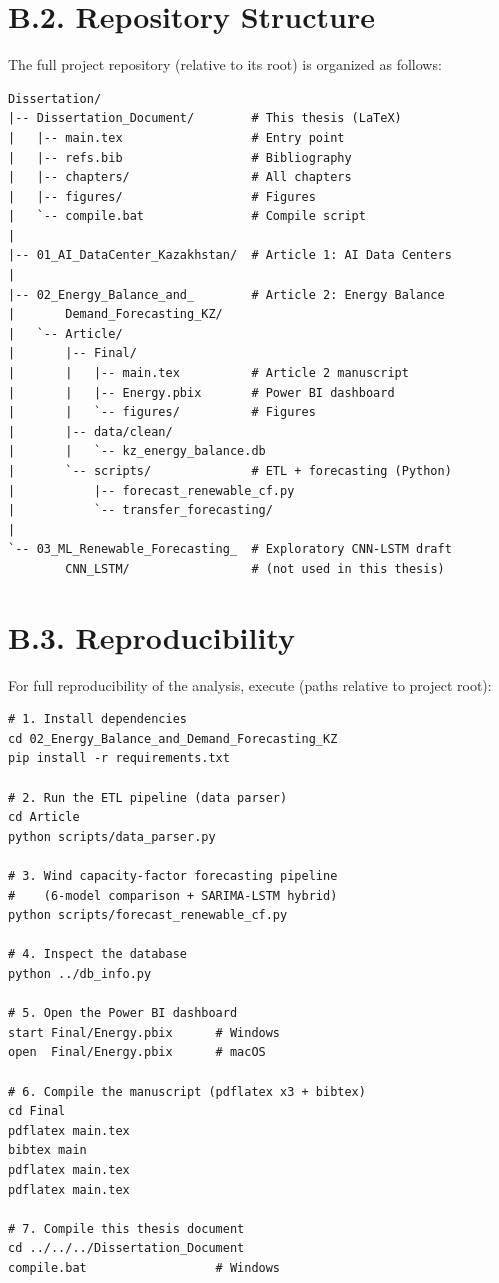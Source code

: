 \section*{B.2. Repository Structure}

The full project repository (relative to its root) is organized as follows:

{\footnotesize
\begin{verbatim}
Dissertation/
|-- Dissertation_Document/        # This thesis (LaTeX)
|   |-- main.tex                  # Entry point
|   |-- refs.bib                  # Bibliography
|   |-- chapters/                 # All chapters
|   |-- figures/                  # Figures
|   `-- compile.bat               # Compile script
|
|-- 01_AI_DataCenter_Kazakhstan/  # Article 1: AI Data Centers
|
|-- 02_Energy_Balance_and_        # Article 2: Energy Balance
|       Demand_Forecasting_KZ/
|   `-- Article/
|       |-- Final/
|       |   |-- main.tex          # Article 2 manuscript
|       |   |-- Energy.pbix       # Power BI dashboard
|       |   `-- figures/          # Figures
|       |-- data/clean/
|       |   `-- kz_energy_balance.db
|       `-- scripts/              # ETL + forecasting (Python)
|           |-- forecast_renewable_cf.py
|           `-- transfer_forecasting/
|
`-- 03_ML_Renewable_Forecasting_  # Exploratory CNN-LSTM draft
        CNN_LSTM/                 # (not used in this thesis)
\end{verbatim}
}

\section*{B.3. Reproducibility}

For full reproducibility of the analysis, execute (paths relative to project root):

{\footnotesize
\begin{verbatim}
# 1. Install dependencies
cd 02_Energy_Balance_and_Demand_Forecasting_KZ
pip install -r requirements.txt

# 2. Run the ETL pipeline (data parser)
cd Article
python scripts/data_parser.py

# 3. Wind capacity-factor forecasting pipeline
#    (6-model comparison + SARIMA-LSTM hybrid)
python scripts/forecast_renewable_cf.py

# 4. Inspect the database
python ../db_info.py

# 5. Open the Power BI dashboard
start Final/Energy.pbix      # Windows
open  Final/Energy.pbix      # macOS

# 6. Compile the manuscript (pdflatex x3 + bibtex)
cd Final
pdflatex main.tex
bibtex main
pdflatex main.tex
pdflatex main.tex

# 7. Compile this thesis document
cd ../../../Dissertation_Document
compile.bat                  # Windows
\end{verbatim}
}

